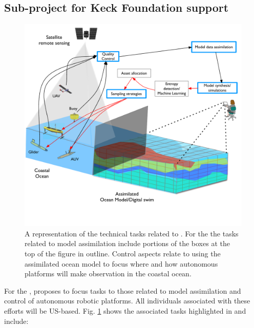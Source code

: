 \subsection{Sub-project for Keck Foundation support}

\begin{figure}[H]
  \centering
  \includegraphics[scale=0.6]{fig/Audacious-pilot-block-diag-2.pdf}
  \caption{A representation of the technical tasks related to \proe. For
    the \kck the tasks related to model assimilation include portions of
    the boxes at the top of the figure in {\color{blue}{blue}}
    outline. Control aspects relate to using the assimilated ocean model
    to focus where and how autonomous platforms will make observation in
    the coastal ocean.}
    \label{fig:block-diag}
\end{figure}

For the \kcke, \pro proposes to focus tasks to those related to model
assimilation and control of autonomous robotic platforms. All
individuals associated with these efforts will be US-based.
Fig. \ref{fig:block-diag} shows the associated tasks highlighted in
{\color{blue}{blue}} and include:

